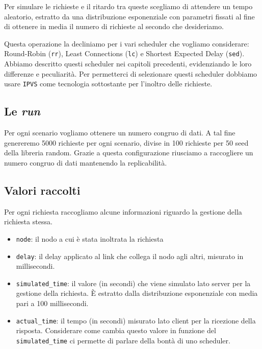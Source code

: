 \documentclass[12pt, hidelinks]{report}
\begin{document}
Per simulare le richieste e il ritardo tra queste scegliamo di attendere un tempo aleatorio, estratto da una distribuzione esponenziale con parametri fissati al fine di ottenere in media il numero di richieste al secondo che desideriamo.

Questa operazione la decliniamo per i vari scheduler che vogliamo considerare: Round-Robin (\texttt{rr}), Least Connections (\texttt{lc}) e Shortest Expected Delay (\texttt{sed}). Abbiamo descritto questi scheduler nei capitoli precedenti, evidenziando le loro differenze e peculiarità. Per permetterci di selezionare questi scheduler dobbiamo usare \texttt{IPVS} come tecnologia sottostante per l'inoltro delle richieste.

\subsection{Le \textit{run}}
Per ogni scenario vogliamo ottenere un numero congruo di dati. A tal fine genereremo 5000 richieste per ogni scenario, divise in 100 richieste per 50 seed della libreria random. Grazie a questa configurazione riusciamo a raccogliere un numero congruo di dati mantenendo la replicabilità.

\subsection{Valori raccolti}
Per ogni richiesta raccogliamo alcune informazioni riguardo la gestione della richiesta stessa.

\begin{itemize}
    \item \texttt{node}: il nodo a cui è stata inoltrata la richiesta
    \item \texttt{delay}: il delay applicato al link che collega il nodo agli altri, misurato in millisecondi.
    \item \texttt{simulated\_time}: il valore (in secondi) che viene simulato lato server per la gestione della richiesta. È estratto dalla distribuzione esponenziale con media pari a 100 millisecondi.
    \item \texttt{actual\_time}: il tempo (in secondi) misurato lato client per la ricezione della risposta. Considerare come cambia questo valore in funzione del \texttt{simulated\_time} ci permette di parlare della bontà di uno scheduler.
\end{itemize}
\end{document}
